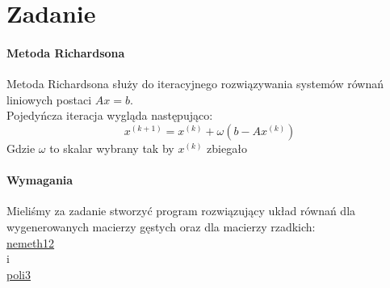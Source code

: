 \section{Zadanie}
\paragraph{Metoda Richardsona} 
Metoda Richardsona służy do iteracyjnego rozwiązywania systemów równań liniowych postaci $Ax = b$.
\\
Pojedyńcza iteracja wygląda następująco:
\[
    x^{(k+1)} = x^{(k)} + \omega (b - Ax^{(k)}) 
\]
Gdzie $\omega$ to skalar wybrany tak by $x^{(k)}$ zbiegało 
\paragraph{Wymagania}
Mieliśmy za zadanie stworzyć program rozwiązujący układ równań dla wygenerowanych 
macierzy gęstych oraz dla macierzy rzadkich: \\
\href{https://sparse.tamu.edu/Nemeth/nemeth12}{nemeth12} \\
i \\
\href{https://sparse.tamu.edu/Grund/poli3}{poli3}

